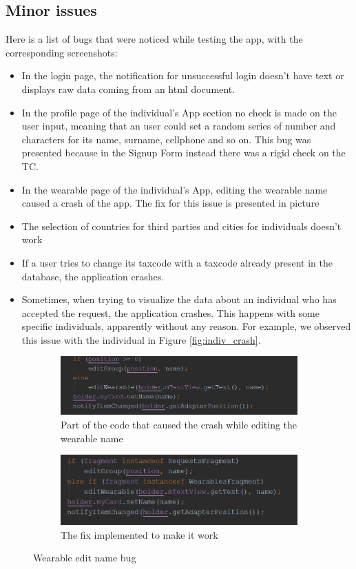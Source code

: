 \subsection{Minor issues}
Here is a list of bugs that were noticed while testing the app, with the corresponding screenshots:
\begin{itemize}
\item[] In the login page, the notification for unsuccessful login doesn't have text or displays raw data coming from an html document.
\item[] In the profile page of the individual's App section no check is made on the user input, meaning that an user could set a random series of number and characters for its name, surname, cellphone and so on. This bug was presented because in the Signup Form instead there was a rigid check on the TC.
\item[] In the wearable page of the individual's App, editing the wearable name caused a crash of the app. The fix for this issue is presented in picture
\item[] The selection of countries for third parties and cities for individuals doesn't work
\item[] If a user tries to change its taxcode with a taxcode already present in the database, the application  crashes.
\item[] Sometimes, when trying to visualize the data about an individual who has accepted the request, the application crashes. This happens with some specific individuals, apparently without any reason. For example, we observed this issue with the individual in Figure \ref{fig:indiv_crash}.
\end{itemize}


\begin{figure}
\centering
\begin{subfigure}{.5\textwidth}
  \centering
   \includegraphics[scale=0.6]{resources/bugwearablwe.png}
   \caption{Part of the code that caused the crash while editing the wearable name}
  \label{fig:sub1}
\end{subfigure}%
\begin{subfigure}{.5\textwidth}
  \centering
   \includegraphics[scale=0.6]{resources/bugfixed.png}
   \caption{The fix implemented to make it work}
  \label{fig:sub2}
\end{subfigure}
\caption{Wearable edit name bug}
\label{fig:test}
\end{figure}

